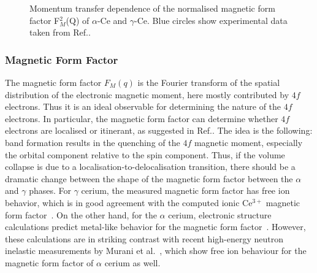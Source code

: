 \documentclass[10pt]{ruthesis}
\begin{document}
{%
%
\begin{figure}[!t]
\caption{Momentum transfer dependence of the normalised magnetic form factor F$^2_M$(Q) of $\alpha$-Ce and $\gamma$-Ce. Blue circles show experimental data taken from Ref.\cite{murani}. 
}
\label{fig1_Ce}
\end{figure}
%


\subsubsection{Magnetic Form Factor}
The magnetic form factor $F_M(q)$ is the
Fourier transform of the spatial distribution of the electronic
magnetic moment, here mostly contributed by $4f$ electrons. Thus it is
an ideal observable for determining the nature of the $4f$ electrons.
In particular, the magnetic form factor can determine whether $4f$
electrons are localised or itinerant, as suggested in
Ref.\cite{hjelm1994}. The idea is the following: band formation
results in the quenching of the $4f$ magnetic moment, especially the
orbital component relative to the spin component. Thus, if the volume
collapse is due to a localisation-to-delocalisation transition, there
should be a dramatic change between the shape of the magnetic form
factor between the $\alpha$ and $\gamma$ phases.  For $\gamma$ cerium,
the measured magnetic form factor has free ion behavior, which is in
good agreement with the computed ionic Ce$^{3+}$ magnetic form
factor~\cite{stassis}.  On the other hand, for the $\alpha$ cerium,
electronic structure calculations predict metal-like behavior for the
magnetic form factor~\cite{hjelm1994}.  However, these calculations
are in striking contrast with recent high-energy neutron inelastic
measurements by Murani et al.~\cite{murani}, which show free ion
behaviour for the magnetic form factor of $\alpha$ cerium as well.


}
\end{document}
